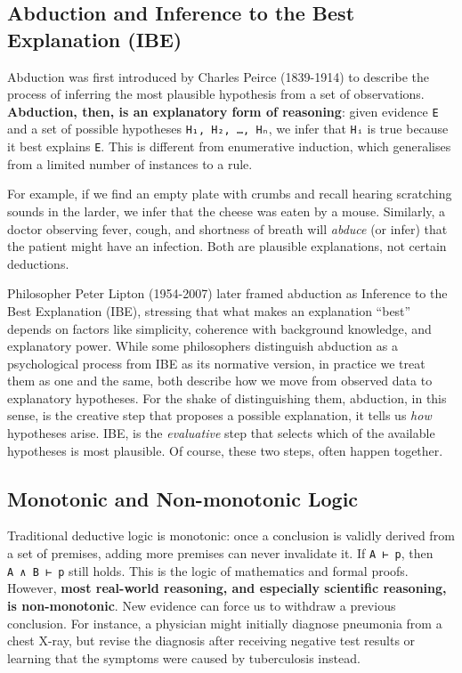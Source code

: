 \documentclass[
  12pt,
]{book}
\begin{document}
\subsection{Abduction and Inference to the Best Explanation (IBE)}\label{abduction-and-inference-to-the-best-explanation-ibe}

Abduction was first introduced by Charles Peirce (1839-1914) to describe the process of inferring the most plausible hypothesis from a set of observations. \textbf{Abduction, then, is an explanatory form of reasoning}: given evidence \texttt{E} and a set of possible hypotheses \texttt{H₁,\ H₂,\ …,\ Hₙ}, we infer that \texttt{Hᵢ} is true because it best explains \texttt{E}. This is different from enumerative induction, which generalises from a limited number of instances to a rule.

For example, if we find an empty plate with crumbs and recall hearing scratching sounds in the larder, we infer that the cheese was eaten by a mouse. Similarly, a doctor observing fever, cough, and shortness of breath will \emph{abduce} (or infer) that the patient might have an infection. Both are plausible explanations, not certain deductions.

Philosopher Peter Lipton (1954-2007) later framed abduction as Inference to the Best Explanation (IBE), stressing that what makes an explanation ``best'' depends on factors like simplicity, coherence with background knowledge, and explanatory power. While some philosophers distinguish abduction as a psychological process from IBE as its normative version, in practice we treat them as one and the same, both describe how we move from observed data to explanatory hypotheses. For the shake of distinguishing them, abduction, in this sense, is the creative step that proposes a possible explanation, it tells us \emph{how} hypotheses arise. IBE, is the \emph{evaluative} step that selects which of the available hypotheses is most plausible. Of course, these two steps, often happen together.

\subsection{Monotonic and Non-monotonic Logic}\label{monotonic-and-non-monotonic-logic}

Traditional deductive logic is monotonic: once a conclusion is validly derived from a set of premises, adding more premises can never invalidate it. If \texttt{A\ ⊢\ p}, then \texttt{A\ ∧\ B\ ⊢\ p} still holds. This is the logic of mathematics and formal proofs. However, \textbf{most real-world reasoning, and especially scientific reasoning, is non-monotonic}. New evidence can force us to withdraw a previous conclusion. For instance, a physician might initially diagnose pneumonia from a chest X-ray, but revise the diagnosis after receiving negative test results or learning that the symptoms were caused by tuberculosis instead.
\end{document}
